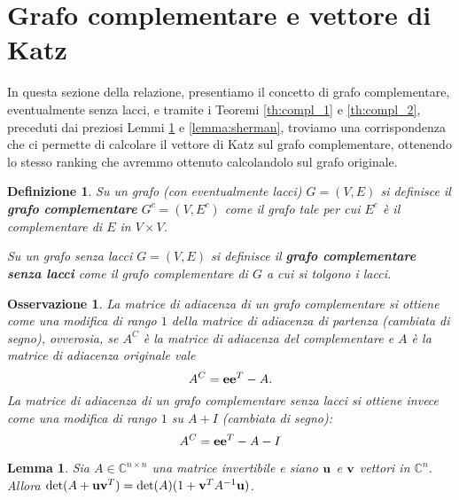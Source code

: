 \documentclass[a4paper]{article}
\newcommand{\CC}{\mathbb{C}}
\newcommand{\evec}{{\bf e}}
\newcommand{\vvec}{{\bf v}}
\newcommand{\uvec}{{\bf u}}
\newtheorem{lemma}{Lemma}
\newtheorem{definition}{Definizione}
\newtheorem{remark}{Osservazione}
\begin{document}
\section{Grafo complementare e vettore di Katz}

In questa sezione della relazione, presentiamo il concetto di grafo
complementare, eventualmente senza lacci, e tramite i Teoremi
\ref{th:compl_1} e \ref{th:compl_2}, preceduti dai preziosi Lemmi
\ref{lemma:matrix_determinant_lemma} e \ref{lemma:sherman},
troviamo una corrispondenza che ci permette di calcolare il vettore di
Katz sul grafo complementare, ottenendo lo stesso ranking che avremmo
ottenuto calcolandolo sul grafo originale.

\begin{definition}
    Su un grafo (con eventualmente lacci) $G = (V, E)$ si definisce il {\rm \textbf{grafo complementare}}
    $G^c = (V, E^c)$ come il grafo tale per cui $E^c$ è il complementare di $E$ in $V \times V$.


    Su un grafo senza lacci $G = (V, E)$ si definisce il {\rm \textbf{grafo complementare senza lacci}} come il grafo complementare di $G$ a cui
    si tolgono i lacci.
\end{definition}

\begin{remark}
    La matrice di adiacenza di un grafo complementare si ottiene come
    una modifica di rango $1$ della matrice di adiacenza di partenza (cambiata di segno), ovverosia, se $A^C$ è la matrice di adiacenza
    del complementare e $A$ è la matrice di adiacenza originale vale
    \[
        A^C = \evec \evec^T - A.
    \]
    La matrice di adiacenza di un grafo complementare senza lacci si
    ottiene invece come una modifica di rango $1$ su $A+I$ (cambiata
    di segno):
    \[
        A^C = \evec \evec^T - A - I
    \]
\end{remark}

\begin{lemma}
    \label{lemma:matrix_determinant_lemma}
    Sia $A \in \CC^{n \times n}$ una matrice invertibile e siano $\uvec$ e $\vvec$ vettori in
    $\CC^n$. Allora $\det(A + \uvec \vvec^T) = \det(A) (1+\vvec^TA^{-1}\uvec)$.
\end{lemma}
\end{document}
